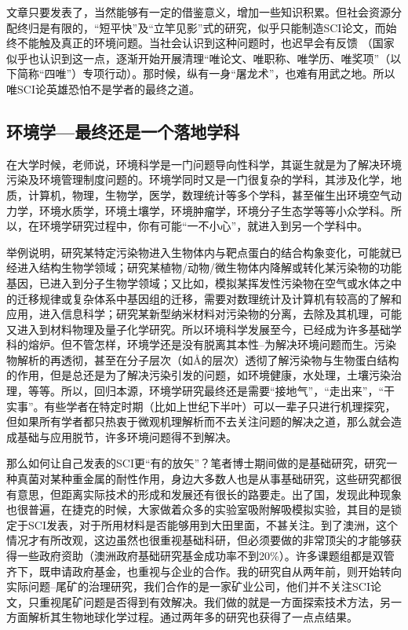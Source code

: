 \documentclass[]{book}
\begin{document}
文章只要发表了，当然能够有一定的借鉴意义，增加一些知识积累。但社会资源分配终归是有限的，``短平快''及``立竿见影''式的研究，似乎只能制造SCI论文，而始终不能触及真正的环境问题。当社会认识到这种问题时，也迟早会有反馈 （国家似乎也认识到这一点，逐渐开始开展清理``唯论文、唯职称、唯学历、唯奖项''（以下简称``四唯''）专项行动）。那时候，纵有一身``屠龙术''，也难有用武之地。所以唯SCI论英雄恐怕不是学者的最终之道。

\hypertarget{ux73afux5883ux5b66ux6700ux7ec8ux8fd8ux662fux4e00ux4e2aux843dux5730ux5b66ux79d1}{%
\subsection{环境学---最终还是一个落地学科}\label{ux73afux5883ux5b66ux6700ux7ec8ux8fd8ux662fux4e00ux4e2aux843dux5730ux5b66ux79d1}}

在大学时候，老师说，环境科学是一门问题导向性科学，其诞生就是为了解决环境污染及环境管理制度问题的。环境学同时又是一门很复杂的学科，其涉及化学，地质，计算机，物理，生物学，医学，数理统计等多个学科，甚至催生出环境空气动力学，环境水质学，环境土壤学，环境肿瘤学，环境分子生态学等等小众学科。所以，在环境学研究过程中，你有可能``一不小心''，就进入到另一个学科中。

举例说明，研究某特定污染物进入生物体内与靶点蛋白的结合构象变化，可能就已经进入结构生物学领域；研究某植物/动物/微生物体内降解或转化某污染物的功能基因，已进入到分子生物学领域；又比如，模拟某挥发性污染物在空气或水体之中的迁移规律或复杂体系中基因组的迁移，需要对数理统计及计算机有较高的了解和应用，进入信息科学；研究某新型纳米材料对污染物的分离，去除及其机理，可能又进入到材料物理及量子化学研究。所以环境科学发展至今，已经成为许多基础学科的熔炉。但不管怎样，环境学还是没有脱离其本性--为解决环境问题而生。污染物解析的再透彻，甚至在分子层次（如Å的层次）透彻了解污染物与生物蛋白结构的作用，但是总还是为了解决污染引发的问题，如环境健康，水处理，土壤污染治理，等等。所以，回归本源，环境学研究最终还是需要``接地气''，``走出来''，``干实事''。有些学者在特定时期（比如上世纪下半叶）可以一辈子只进行机理探究，但如果所有学者都只热衷于微观机理解析而不去关注问题的解决之道，那么就会造成基础与应用脱节，许多环境问题得不到解决。

那么如何让自己发表的SCI更``有的放矢''？笔者博士期间做的是基础研究，研究一种真菌对某种重金属的耐性作用，身边大多数人也是从事基础研究，这些研究都很有意思，但距离实际技术的形成和发展还有很长的路要走。出了国，发现此种现象也很普遍，在捷克的时候，大家做着众多的实验室吸附解吸模拟实验，其目的是锁定于SCI发表，对于所用材料是否能够用到大田里面，不甚关注。到了澳洲，这个情况才有所改观，这边虽然也很重视基础科研，但必须要做的非常顶尖的才能够获得一些政府资助（澳洲政府基础研究基金成功率不到20\%）。许多课题组都是双管齐下，既申请政府基金，也重视与企业的合作。我的研究自从两年前，则开始转向实际问题--尾矿的治理研究，我们合作的是一家矿业公司，他们并不关注SCI论文，只重视尾矿问题是否得到有效解决。我们做的就是一方面探索技术方法，另一方面解析其生物地球化学过程。通过两年多的研究也获得了一点点结果。
\end{document}
